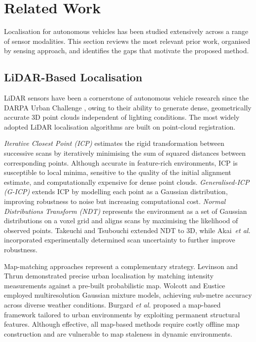 \documentclass[lettersize,journal]{IEEEtran}
\begin{document}
\section{Related Work}\label{sec:related}

Localisation for autonomous vehicles has been studied extensively across a range of
sensor modalities. This section reviews the most relevant prior work, organised by
sensing approach, and identifies the gaps that motivate the proposed method.

\subsection{LiDAR-Based Localisation}

LiDAR sensors have been a cornerstone of autonomous vehicle research since the
DARPA Urban Challenge \cite{hussain2019autonomous}, owing to their ability to
generate dense, geometrically accurate 3D point clouds independent of lighting
conditions. The most widely adopted LiDAR localisation algorithms are built on
point-cloud registration.

\textit{Iterative Closest Point (ICP)} \cite{besl1992method} estimates the rigid
transformation between successive scans by iteratively minimising the sum of
squared distances between corresponding points. Although accurate in
feature-rich environments, ICP is susceptible to local minima, sensitive to
the quality of the initial alignment estimate, and computationally expensive
for dense point clouds. \textit{Generalised-ICP (G-ICP)} \cite{segal2009generalized}
extends ICP by modelling each point as a Gaussian distribution, improving robustness
to noise but increasing computational cost. \textit{Normal Distributions Transform
(NDT)} \cite{biber2003normal} represents the environment as a set of Gaussian
distributions on a voxel grid and aligns scans by maximising the likelihood of
observed points. Takeuchi and Tsubouchi \cite{takeuchi2006scan} extended NDT to 3D,
while Akai~\textit{et al.} \cite{akai2017robust} incorporated experimentally
determined scan uncertainty to further improve robustness.

Map-matching approaches represent a complementary strategy. Levinson and
Thrun \cite{levinson2010robust} demonstrated precise urban localisation by matching
intensity measurements against a pre-built probabilistic map. Wolcott and
Eustice \cite{wolcott2017robust} employed multiresolution Gaussian mixture models,
achieving sub-metre accuracy across diverse weather conditions. Burgard
\textit{et al.} \cite{burgard2008map} proposed a map-based framework tailored
to urban environments by exploiting permanent structural features. Although effective,
all map-based methods require costly offline map construction and are vulnerable to
map staleness in dynamic environments.
\end{document}
